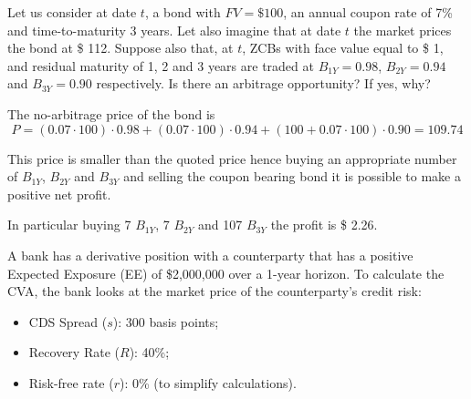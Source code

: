 \documentclass[12pt,a4paper]{exam}
\begin{document}
\begin{questions}

\question
Let us consider at date $t$, a bond with $FV = \$ 100$, an annual coupon rate of 7\% and time-to-maturity 3 years.
Let also imagine that at date $t$ the market prices the bond at \$ 112. Suppose also that, at $t$, ZCBs with face value equal to \$ 1, and residual maturity of 1, 2 and 3 years are traded at $B_{1Y} = 0.98$, $B_{2Y} = 0.94$ and $B_{3Y} = 0.90$ respectively.
Is there an arbitrage opportunity? If yes, why?
\makeemptybox{15cm}
\begin{solution}
	The no-arbitrage price of the bond is
	\begin{equation*}
		P = (0.07\cdot100)\cdot 0.98 + (0.07\cdot100)\cdot 0.94 + (100 + 0.07\cdot100)\cdot 0.90 = 109.74
	\end{equation*}
	
	This price is smaller than the quoted price hence buying an appropriate number of $B_{1Y}$, $B_{2Y}$ and $B_{3Y}$ and selling the coupon bearing bond it is possible to make a positive net profit.
	
	In particular buying 7 $B_{1Y}$, 7 $B_{2Y}$ and 107 $B_{3Y}$ the profit is \$ 2.26.
\end{solution}


\question 
A bank has a derivative position with a counterparty that has a positive Expected Exposure (EE) of \$2,000,000 over a 1-year horizon. To calculate the CVA, the bank looks at the market price of the counterparty's credit risk:
\begin{itemize}
	\item CDS Spread ($s$): 300 basis points;
	\item Recovery Rate ($R$): 40\%;
	\item Risk-free rate ($r$): 0\% (to simplify calculations).
\end{itemize}

\end{questions}
\end{document}
